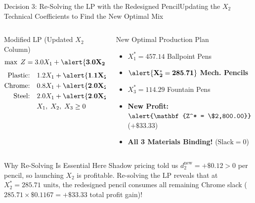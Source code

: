 \documentclass{beamer}
\begin{document}
\begin{frame}{Decision 3: Re-Solving the LP with the Redesigned Pencil}{Updating the $X_2$ Technical Coefficients to Find the New Optimal Mix}
    \begin{columns}[T]
        \begin{column}{0.52\textwidth}
            \begin{block}{Modified LP (Updated $X_2$ Column)}
                \footnotesize
                \[ \max \; Z = 3.0 X_1 + \alert{\mathbf{3.0 X_2}} + 5.0 X_3 \]
                \vspace{-0.6em}
                \begin{align*}
                \text{Plastic:}\quad & 1.2 X_1 + \alert{\mathbf{1.1 X_2}} + 1.2 X_3 \le 1000 \\
                \text{Chrome:}\quad  & 0.8 X_1 + \alert{\mathbf{2.0 X_2}} + 2.3 X_3 \le 1200 \\
                \text{Steel:}\quad   & 2.0 X_1 + \alert{\mathbf{2.0 X_2}} + 4.5 X_3 \le 2000 \\
                & X_1,\; X_2,\; X_3 \ge 0
                \end{align*}
            \end{block}
        \end{column}
        \begin{column}{0.45\textwidth}
            \begin{exampleblock}{New Optimal Production Plan}
                \footnotesize
                \begin{itemize}\setlength{\itemsep}{0.15em}
                    \item $X_1^* = 457.14$ Ballpoint Pens
                    \item $\alert{\mathbf{X_2^* = 285.71}}$ \textbf{Mech. Pencils}
                    \item $X_3^* = 114.29$ Fountain Pens
                    \item \textbf{New Profit:} $\alert{\mathbf{Z^* = \$2,800.00}}$ ($+\$33.33$)
                    \item \textbf{All 3 Materials Binding!} ($\text{Slack} = 0$)
                \end{itemize}
            \end{exampleblock}
        \end{column}
    \end{columns}
    \vspace{0.2em}
    \begin{alertblock}{Why Re-Solving Is Essential Here}
        \scriptsize
        Shadow pricing told us $d_2^{\text{new}} = +\$0.12 > 0$ per pencil, so launching $X_2$ is profitable. Re-solving the LP reveals that at $X_2^* = 285.71\text{ units}$, the redesigned pencil consumes all remaining Chrome slack ($285.71 \times \$0.1167 = +\$33.33$ total profit gain)!
    \end{alertblock}
\end{frame}
\end{document}
